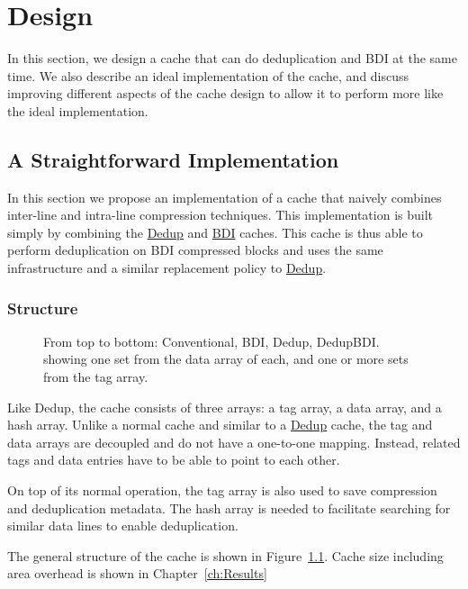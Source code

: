 
\chapter{Design}
\label{ch:Design}
In this section, we design a cache that can do deduplication and BDI at the same time. We also describe an ideal implementation of the cache, and discuss improving different aspects of the cache design to allow it to perform more like the ideal implementation.
\section{A Straightforward Implementation}
\label{sec:Straightforward Implementation}
In this section we propose an implementation of a cache that naively combines inter-line and intra-line compression techniques. This implementation is built simply by combining the \hyperref[sec:Dedup]{Dedup} and \hyperref[sec:BDI]{BDI} caches. This cache is thus able to perform deduplication on BDI compressed blocks and uses the same infrastructure and a similar replacement policy to \hyperref[sec:Dedup]{Dedup}.

\subsection{Structure}
\label{ssec:DedupBDIStructure}
\begin{figure}
    \caption[DedupBDI Cache]{From top to bottom: Conventional, BDI, Dedup, DedupBDI. showing one set from the data array of each, and one or more sets from the tag array.}
    \label{fig:DedupBDI}
\end{figure}
Like Dedup, the cache consists of three arrays: a tag array, a data array, and a hash array. Unlike a normal cache and similar to a \hyperref[sec:Dedup]{Dedup} cache, the tag and data arrays are decoupled and do not have a one-to-one mapping. Instead, related tags and data entries have to be able to point to each other.\par
On top of its normal operation, the tag array is also used to save compression and deduplication metadata. The hash array is needed to facilitate searching for similar data lines to enable deduplication.\par
The general structure of the cache is shown in Figure~\ref{fig:DedupBDI}. Cache size including area overhead is shown in Chapter~\ref{ch:Results}
